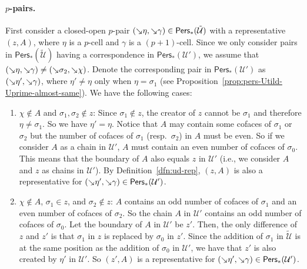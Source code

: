 \documentclass[letterpaper,11pt]{article}
\theoremstyle{mythmstyle}
\theoremstyle{mydefstyle}
\theoremstyle{plain}
\theoremstyle{definition}
\newcommand{\Pers}{\mathsf{Pers}}
\newcommand{\<}[1]{\langle #1\rangle}
\newcommand{\add}[1]{\mskip-2.5mu\rotatebox[origin=c]{-45}{${\rightarrow}$}{#1}}
\newcommand{\Ucal}{\mathcal{U}}
\newcommand{\sG}{\sigma}
\newcommand{\Dim}{p}
\newcommand{\extsimp}{\chi}
\begin{document}
\paragraph{$\Dim$-pairs.}
First consider a  closed-open $\Dim$-pair $(\add{\eta},\add{\gamma})\in\Pers_*(\tilde{\Ucal})$
with a representative  $(z,A)$,
where $\eta$ is a $\Dim$-cell and $\gamma$ is a $(\Dim+1)$-cell.
Since we only consider pairs in $\Pers_*(\tilde{\Ucal})$ having a correspondence in $\Pers_*(\Ucal')$,
we assume that $(\add{\eta},\add{\gamma})\neq(\add{\sG_2},\add{\extsimp})$.
Denote the corresponding pair in 
$\Pers_*(\Ucal')$ as $(\add{\eta'},\add{\gamma})$,
where $\eta'\neq\eta$ only when ${\eta}={\sG_1}$ (see Proposition~\ref{prop:pers-Utild-Uprime-almost-same}).
We have the following cases:
\begin{enumerate}
    \item\label{itm:sG1-nin-z-sG2-nin-z-oG-nin-A} 
    $\extsimp\not\in A$ and $\sG_1,\sG_2\not\in z$:
    Since $\sG_1\not\in z$, the creator of $z$ cannot be $\sG_1$
    and therefore $\eta\neq\sG_1$.
    So we have $\eta'=\eta$.
    Notice that $A$ may contain some cofaces of $\sG_1$ or $\sG_2$
    but the number of cofaces of $\sG_1$ (resp.\ $\sG_2$) in $A$ must be even.
    So if we consider $A$ as a  chain in $\Ucal'$,
    $A$ must contain an even number of cofaces of $\sG_0$.
    This means that the boundary of $A$  also equals $z$ in $\Ucal'$
    (i.e., we consider $A$ and $z$ as chains in $\Ucal'$).
    By Definition~\ref{dfn:ud-rep}, $(z,A)$ is also a  representative for 
    $(\add{\eta'},\add{\gamma})\in\Pers_*(\Ucal')$.
    
    \item\label{itm:sG1-in-z-sG2-nin-z-oG-nin-A} 
    $\extsimp\not\in A$, $\sG_1\in z$, and $\sG_2\not\in z$:
    $A$ contains an odd number of cofaces of $\sG_1$
    and an even number of cofaces of $\sG_2$.
    So the chain $A$ in $\Ucal'$ contains an odd number of cofaces of $\sG_0$.
    Let the boundary of $A$ in $\Ucal'$ be $z'$.
    Then, the only difference of $z$ and $z'$ is that $\sG_1$ in $z$
    is replaced by $\sG_0$ in $z'$.
    Since  the addition of $\sG_1$ in $\tilde{\Ucal}$ is at the same position as
     the addition of $\sG_0$ in $\Ucal'$,
    we have that $z'$ is also  created by
    $\eta'$
    in $\Ucal'$.
    So $(z',A)$ is a representative for 
    $(\add{\eta'},\add{\gamma})\in\Pers_*(\Ucal')$.
    

\end{enumerate}
\end{document}
